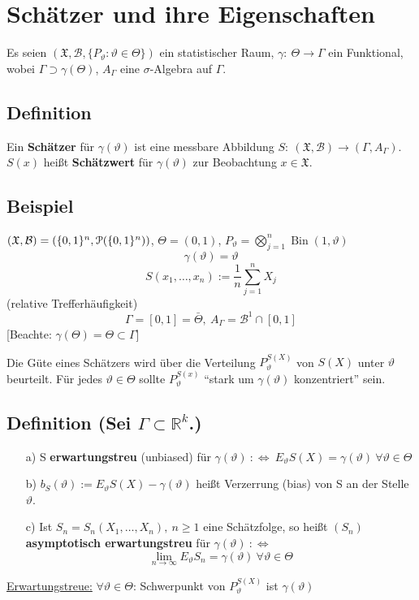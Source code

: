\documentclass[a4paper,11pt,twoside,titlepage]{article}
\newcommand{\R}{{\mathbb R}}
\newcommand{\XX}{{\mathfrak X}} %
\newcommand\PM{ \EuScript{P} } %
\newcommand\BB{ \mathcal{B} } %
\DeclareMathOperator{\Bin}{Bin}
\begin{document}
\cleardoublepage
\section{Schätzer und ihre Eigenschaften}
Es seien $(\XX,\BB,\{P_\vartheta: \vartheta\in\Theta\})$ ein statistischer Raum, $\gamma:\ \Theta\to\Gamma$ ein Funktional, wobei $\Gamma\supset\gamma(\Theta)$, $A_\Gamma$ eine $\sigma$-Algebra auf $\Gamma$.

\subsection{Definition}
Ein \textbf{Schätzer} für $\gamma(\vartheta)$ ist eine messbare Abbildung $S:\ (\XX,\BB)\to(\Gamma,A_\Gamma)$.\\
$S(x)$ heißt \textbf{Schätzwert} für $\gamma(\vartheta)$ zur Beobachtung $x\in\XX$.

\subsection{Beispiel}
$(\XX,\BB)=(\{0,1\}^n,\PM(\{0,1\}^n))$, $\Theta=(0,1)$, $P_\vartheta=\bigotimes_{j=1}^n\Bin(1,\vartheta)$
\[\gamma(\vartheta)=\vartheta\]
\[S(x_1,\ldots,x_n):=\frac1n \sum_{j=1}^n X_j\]
(relative Trefferhäufigkeit)
\[\Gamma=[0,1]=\bar\Theta,\ A_\Gamma=\BB^1\cap[0,1]\]
[Beachte: $\gamma(\Theta)=\Theta\subset\Gamma$]

Die Güte eines Schätzers wird über die Verteilung $P_\vartheta^{S(X)}$ von $S(X)$ unter $\vartheta$ beurteilt. Für jedes $\vartheta\in\Theta$ sollte $P_\vartheta^{S(x)}$ "`stark um $\gamma(\vartheta)$ konzentriert"' sein.

\subsection{Definition \textnormal{(Sei $\Gamma\subset\R^k$.)}}
\begin{itemize}
\item[a)] S \textbf{erwartungstreu} (unbiased) für $\gamma(\vartheta)\ :\Leftrightarrow\ E_\vartheta S(X)=\gamma(\vartheta)\ \forall\vartheta\in\Theta$
\item[b)] $b_S(\vartheta):=E_\vartheta S(X)-\gamma(\vartheta)$ heißt Verzerrung (bias) von S an der Stelle $\vartheta$.
\item[c)] Ist $S_n=S_n(X_1,\ldots,X_n),\ n\geq1$ eine Schätzfolge, so heißt $(S_n)$ \textbf{asymptotisch erwartungstreu} für $\gamma(\vartheta)\ :\Leftrightarrow$\[\lim_{n\to\infty}E_\vartheta S_n=\gamma(\vartheta)\ \forall\vartheta\in\Theta\]
\end{itemize}
\underline{Erwartungstreue:} $\forall\vartheta\in\Theta$: Schwerpunkt von $P_\vartheta^{S(X)}$ ist $\gamma(\vartheta)$
\end{document}
